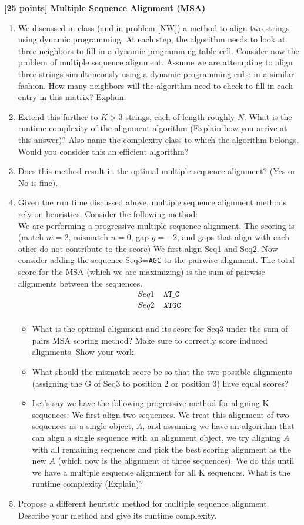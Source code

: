{\bf [25 points] Multiple Sequence Alignment (MSA)}\\
\begin{enumerate}

\item We discussed in class (and in problem \ref{NW}) a method to align two strings using dynamic programming. At each step, the algorithm needs to look at three neighbors to fill in a dynamic programming table cell. Consider now the problem of multiple sequence alignment.  Assume we are attempting to align three strings simultaneously using a dynamic programming cube in a similar fashion. How many neighbors will the algorithm need to check to fill in each entry in this matrix? Explain.
\item Extend this further to $K>3$ strings, each of length roughly $N$. What is the runtime complexity of the alignment algorithm (Explain how you arrive at this answer)? Also name the complexity class to which the algorithm belongs. Would you consider this an efficient algorithm?
\item Does this method result in the optimal multiple sequence alignment? (Yes or No is fine).
\item Given the run time discussed above, multiple sequence alignment methods rely on heuristics. Consider the following method:\\
We are performing a progressive multiple sequence alignment. The scoring is (match $m=2$, mismatch $n=0$, gap $g=-2$, and gaps that align with each other do not contribute to the score)
We first align Seq1 and Seq2. Now consider adding the sequence Seq3=\texttt{AGC} to the pairwise alignment. The total score for the MSA (which we are maximizing) is the sum of pairwise alignments between the sequences. 
\begin{align*}
Seq1& \texttt{  AT\_C}\\
Seq2& \texttt{  ATGC}\\
\end{align*}
\begin{itemize}
\item What is the optimal alignment and its score for Seq3 under the sum-of-pairs MSA scoring method? Make sure to correctly score induced alignments. Show your work.
\item What should the mismatch score be so that the two possible alignments (assigning the G of Seq3 to position 2 or position 3) have equal scores?
\item Let's say we have the following progressive method for aligning K sequences: We first align two sequences. We treat this alignment of two sequences as a single object, $A$, and assuming we have an algorithm that can align a single sequence with an alignment object, we try aligning $A$ with all remaining sequences and pick the best scoring alignment as the new $A$ (which now is the alignment of three sequences). We do this until we have a multiple sequence alignment for all K sequences. What is the runtime complexity (Explain)?
\end{itemize}
\item Propose a different heuristic method for multiple sequence alignment. Describe your method and give its runtime complexity.
\end{enumerate}
